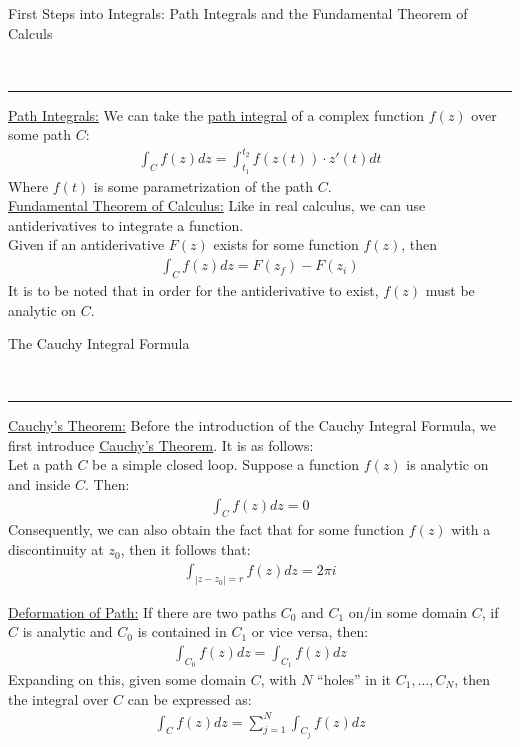 \documentclass{article}
\newcommand{\header}[1]{\begin{large}\noindent #1\end{large}\\\rule{\textwidth}{0.5pt}}
\newcommand{\gap}{\medskip\\}
\newcommand{\sheader}[1]{\underline{#1:}}
\begin{document}
    \header{First Steps into Integrals: Path Integrals and the Fundamental Theorem of Calculs}
    \sheader{Path Integrals}
    We can take the \underline{path integral} of a complex function $f(z)$ over some 
    path $C$:
    \begin{align*}
        \int_C f(z) dz = \int_{t_1}^{t_2} f(z(t)) \cdot z'(t)dt
    \end{align*}
    Where $f(t)$ is some parametrization of the path $C$.
    \gap
    \sheader{Fundamental Theorem of Calculus}
    Like in real calculus, we can use antiderivatives to integrate a function.
    \gap
    Given if an antiderivative $F(z)$ exists for some function $f(z)$, then 
    \begin{align*}
        \int_C f(z) dz = F(z_f) - F(z_i)
    \end{align*}
    It is to be noted that in order for the antiderivative to exist, 
    $f(z)$ must be analytic on $C$.
    \gap
    \header{The Cauchy Integral Formula}
    \sheader{Cauchy's Theorem} Before the introduction of the Cauchy Integral Formula,
    we first introduce \underline{Cauchy's Theorem}. It is as follows:
    \gap
    Let a path $C$ be a simple closed loop. Suppose a function $f(z)$ is analytic 
    on and inside $C$. Then:
    \begin{align*}
        \int_C f(z)dz = 0
    \end{align*}
    Consequently, we can also obtain the fact that for some function $f(z)$ with a 
    discontinuity at $z_0$, then it follows that:
    \begin{align*}
        \int_{|z - z_0| = r} f(z) dz = 2\pi i
    \end{align*}

    \sheader{Deformation of Path} If there are two paths $C_0$ and $C_1$ on/in some 
    domain $C$, if $C$ is analytic and $C_0$ is contained in $C_1$ or vice versa, 
    then:
    \begin{align*}
        \int_{C_0}f(z)dz = \int_{C_1}f(z)dz
    \end{align*}
    Expanding on this, given some domain $C$, with $N$ ``holes'' in it $C_1, \ldots, C_N$,
    then the integral over $C$ can be expressed as:
    \begin{align*}
        \int_C f(z)dz = \sum_{j = 1}^N \int_{C_j}f(z)dz
    \end{align*}

    \pagebreak 
\end{document}
